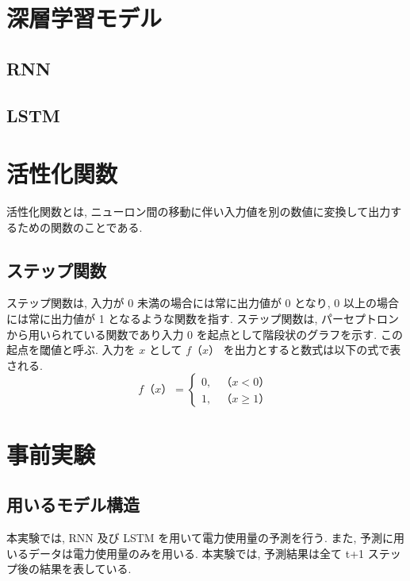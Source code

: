 \section{深層学習モデル}
\subsection{RNN}
\subsection{LSTM}

\section{活性化関数}
活性化関数とは, ニューロン間の移動に伴い入力値を別の数値に変換して出力するための関数のことである.
\subsection{ステップ関数}
ステップ関数は, 入力が 0 未満の場合には常に出力値が 0 となり, 0 以上の場合には常に出力値が 1 となるような関数を指す. ステップ関数は, パーセプトロンから用いられている関数であり入力 0 を起点として階段状のグラフを示す. この起点を閾値と呼ぶ. 入力を $x$ として $f（x）$ を出力とすると数式は以下の式で表される.
\begin{equation}
f（x）= \begin{cases}
0, & （x < 0）\\
1, & （x \geq 1）
\end{cases}
\end{equation}

\section{事前実験}
\subsection{用いるモデル構造}
本実験では, RNN 及び LSTM を用いて電力使用量の予測を行う. また, 予測に用いるデータは電力使用量のみを用いる. 本実験では, 予測結果は全て t+1 ステップ後の結果を表している. 
